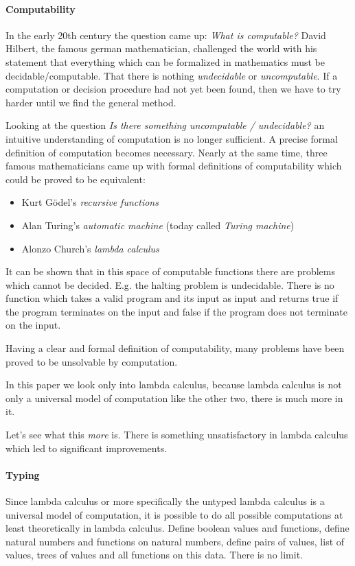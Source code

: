 \paragraph{Computability}
In the early 20th century the question came up: \emph{What is
computable?} David Hilbert, the famous german mathematician, challenged
the world with his statement that everything which can be formalized in
mathematics must be decidable/computable.  That there is nothing
\emph{undecidable} or \emph{uncomputable}. If a computation or decision
procedure had not yet been found, then we have to try harder until we find the
general method.

Looking at the question \emph{Is there something uncomputable / undecidable?} an
intuitive understanding of computation is no longer sufficient. A precise formal
definition of computation becomes necessary. Nearly at the same time, three
famous mathematicians came up with formal definitions of computability which
could be proved to be equivalent:

\begin{itemize}
\item Kurt Gödel's \emph{recursive functions}

\item Alan Turing's \emph{automatic machine} (today called \emph{Turing
machine})

\item Alonzo Church's \emph{lambda calculus}
\end{itemize}

It can be shown that in this space of computable functions there are problems
which cannot be decided. E.g. the halting problem is undecidable. There is no
function which takes a valid program and its input as input and returns true if
the program terminates on the input and false if the program does not terminate
on the input.

Having a clear and formal definition of computability, many problems have been
proved to be unsolvable by computation.

In this paper we look only into lambda calculus, because lambda calculus is not
only a universal model of computation like the other two, there is much more in
it.

Let's see what this \emph{more} is. There is something unsatisfactory in lambda
calculus which led to significant improvements.

\paragraph{Typing}
Since lambda calculus or more specifically the untyped lambda calculus is a
universal model of computation, it is possible to do all possible computations
at least theoretically in lambda calculus. Define boolean values and functions,
define natural numbers and functions on natural numbers, define pairs of values,
list of values, trees of values and all functions on this data. There is no
limit.

